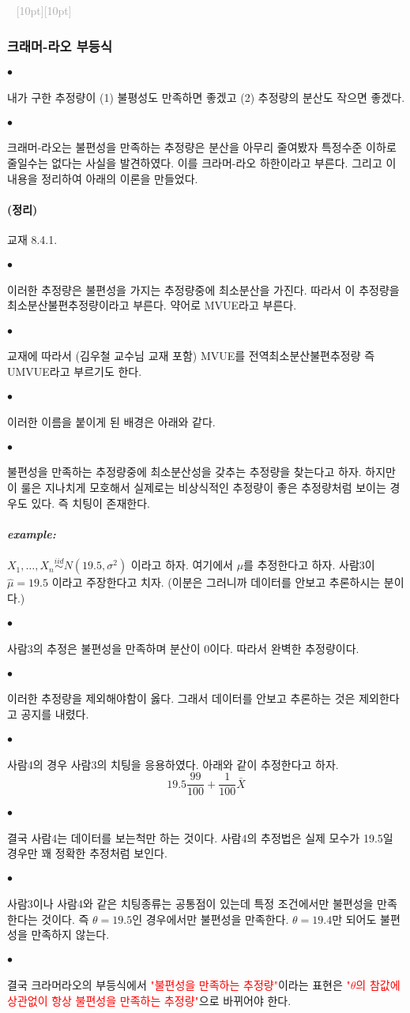 \documentclass[12pt,oneside,english]{book}
\newcommand{\dash}{\vspace{2em}\noindent \textcolor{darkgray}{\hrulefill~ \raisebox{-2.5pt}[10pt][10pt]{\leafright \decofourleft \decothreeleft  \aldineright \decotwo \floweroneleft \decoone   \floweroneright \decotwo \aldineleft\decothreeright \decofourright \leafleft} ~  \hrulefill \\ \vspace{2em}}}
\def\ck{\paragraph{\Large$\bullet$}\Large}
\def\thm{\paragraph{\Large(정리)}\Large}
\def\ex{\paragraph{\Large\textit{example:}}\Large}
\begin{document}
\dash 

\subsubsection{크래머-라오 부등식}

\ck 내가 구한 추정량이 (1) 불평성도 만족하면 좋겠고 (2) 추정량의 분산도 작으면 좋겠다. 

\ck 크래머-라오는 불편성을 만족하는 추정량은 분산을 아무리 줄여봤자 특정수준 이하로 줄일수는 없다는 사실을 발견하였다. 이를 크라머-라오 하한이라고 부른다. 그리고 이 내용을 정리하여 아래의 이론을 만들었다. 

\thm 교재 8.4.1. 

\ck 이러한 추정량은 불편성을 가지는 추정량중에 최소분산을 가진다. 따라서 이 추정량을 최소분산불편추정량이라고 부른다. 약어로 MVUE라고 부른다. 

\ck 교재에 따라서 (김우철 교수님 교재 포함) MVUE를 전역최소분산불편추정량 즉 UMVUE라고 부르기도 한다. 

\ck 이러한 이름을 붙이게 된 배경은 아래와 같다. 

\ck 불편성을 만족하는 추정량중에 최소분산성을 갖추는 추정량을 찾는다고 하자. 하지만 이 룰은 지나치게 모호해서 실제로는 비상식적인 추정량이 좋은 추정량처럼 보이는 경우도 있다. 즉 치팅이 존재한다. 

\ex $X_1,\dots,X_n \overset{iid}{\sim} N(19.5,\sigma^2)$ 이라고 하자. 여기에서 $\mu$를 추정한다고 하자. 사람3이 $\hat{\mu}=19.5$ 이라고 주장한다고 치자. (이분은 그러니까 데이터를 안보고 추론하시는 분이다.)

\ck 사람3의 추정은 불편성을 만족하며 분산이 0이다. 따라서 완벽한 추정량이다. 

\ck 이러한 추정량을 제외해야함이 옳다. 그래서 데이터를 안보고 추론하는 것은 제외한다고 공지를 내렸다. 

\ck 사람4의 경우 사람3의 치팅을 응용하였다. 아래와 같이 추정한다고 하자. 
\[
19.5 \frac{99}{100} + \frac{1}{100} \bar{X}
\]

\ck 결국 사람4는 데이터를 보는척만 하는 것이다. 사람4의 추정법은 실제 모수가 19.5일 경우만 꽤 정확한 추정처럼 보인다. 

\ck 사람3이나 사람4와 같은 치팅종류는 공통점이 있는데 특정 조건에서만 불편성을 만족한다는 것이다. 즉 $\theta=19.5$인 경우에서만 불편성을 만족한다. $\theta=19.4$만 되어도 불편성을 만족하지 않는다. 

\ck 결국 크라머라오의 부등식에서 \textcolor{red}{"불편성을 만족하는 추정량"}이라는 표현은 \textcolor{red}{"$\theta$의 참값에 상관없이 항상 불편성을 만족하는 추정량"}으로 바뀌어야 한다. 
\end{document}
